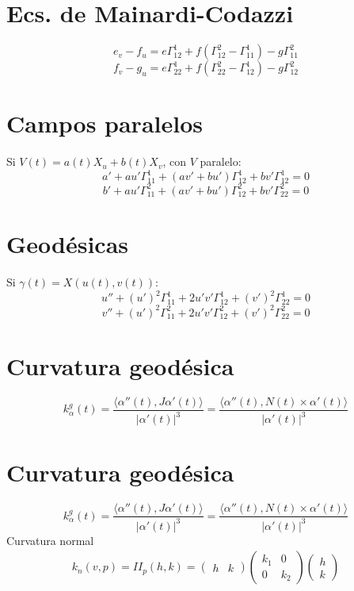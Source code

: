 \documentclass[10pt]{article}
\begin{document}
\begin{multicols}{3}
\section*{Ecs. de Mainardi-Codazzi}
\[
e_v - f_u = e\Gamma^1_{12} + f(\Gamma^2_{12} - \Gamma^1_{11}) - g\Gamma^2_{11}
\]
\[
f_v - g_u = e\Gamma^1_{22} + f(\Gamma^2_{22} - \Gamma^1_{12}) - g\Gamma^2_{12}
\]

\section*{Campos paralelos}
Si $V(t) = a(t)X_u + b(t)X_v$, con $V$ paralelo:
\[
a' + a u' \Gamma^1_{11} + (a v' + b u') \Gamma^1_{12} + b v' \Gamma^1_{12} = 0
\]
\[
b' + a u' \Gamma^2_{11} + (a v' + b u') \Gamma^2_{12} + b v' \Gamma^2_{22} = 0
\]

\section*{Geodésicas}
Si $\gamma(t) = X(u(t), v(t))$:
\[
u'' + (u')^2 \Gamma^1_{11} + 2u'v'\Gamma^1_{12} + (v')^2\Gamma^1_{22} = 0
\]
\[
v'' + (u')^2 \Gamma^2_{11} + 2u'v'\Gamma^2_{12} + (v')^2\Gamma^2_{22} = 0
\]

\section*{Curvatura geodésica}
\[
k^g_\alpha(t) =
\frac{\langle \alpha''(t), J\alpha'(t) \rangle}{|\alpha'(t)|^3}
=
\frac{\langle \alpha''(t), N(t) \times \alpha'(t) \rangle}{|\alpha'(t)|^3}
\]

\section*{Curvatura geodésica}
\[
k^g_\alpha(t) =
\frac{\langle \alpha''(t), J\alpha'(t) \rangle}{|\alpha'(t)|^3}
=
\frac{\langle \alpha''(t), N(t) \times \alpha'(t) \rangle}{|\alpha'(t)|^3}
\]
Curvatura normal
\begin{align*}
  k_{n}(v,p)=II_p(h,k)=\begin{pmatrix}
    h & k
  \end{pmatrix}\begin{pmatrix}
    k_{1} & 0 \\
    0 & k_2
  \end{pmatrix}\begin{pmatrix}
    h\\
    k
  \end{pmatrix}
\end{align*}

\end{multicols}
\end{document}
